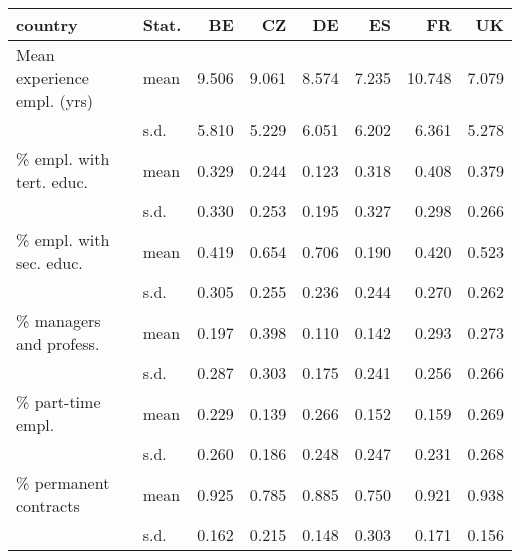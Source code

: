 \begin{tabular}{llrrrrrr}
\toprule
country                     & Stat. & BE    & CZ    & DE    & ES    & FR     & UK    \\
\midrule
Mean experience empl. (yrs) & mean & 9.506 & 9.061 & 8.574 & 7.235 & 10.748 & 7.079 \\
                            & s.d. & 5.810 & 5.229 & 6.051 & 6.202 & 6.361  & 5.278 \\[1ex]
\% empl. with tert. educ.   & mean & 0.329 & 0.244 & 0.123 & 0.318 & 0.408  & 0.379 \\
                            & s.d. & 0.330 & 0.253 & 0.195 & 0.327 & 0.298  & 0.266 \\[1ex]
\% empl. with sec. educ.    & mean & 0.419 & 0.654 & 0.706 & 0.190 & 0.420  & 0.523 \\
                            & s.d. & 0.305 & 0.255 & 0.236 & 0.244 & 0.270  & 0.262 \\[1ex]
\% managers and profess.    & mean & 0.197 & 0.398 & 0.110 & 0.142 & 0.293  & 0.273 \\
                            & s.d. & 0.287 & 0.303 & 0.175 & 0.241 & 0.256  & 0.266 \\[1ex]
\% part-time empl.          & mean & 0.229 & 0.139 & 0.266 & 0.152 & 0.159  & 0.269 \\
                            & s.d. & 0.260 & 0.186 & 0.248 & 0.247 & 0.231  & 0.268 \\[1ex]
\% permanent contracts      & mean & 0.925 & 0.785 & 0.885 & 0.750 & 0.921  & 0.938 \\
                            & s.d. & 0.162 & 0.215 & 0.148 & 0.303 & 0.171  & 0.156 \\
\bottomrule                            
\end{tabular}

